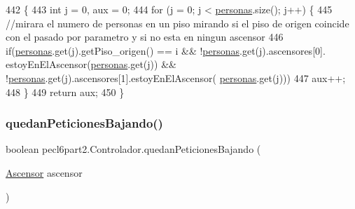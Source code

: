 \begin{DoxyCode}
442     \{
443         \textcolor{keywordtype}{int} j = 0, aux = 0;
444         \textcolor{keywordflow}{for} (j = 0; j < \mbox{\hyperlink{classpecl6part2_1_1_controlador_a570bc37c2db22f144af250ceccbbab6d}{personas}}.size(); j++) \{
445             \textcolor{comment}{//mirara el numero de personas en un piso mirando si el piso de origen coincide con el pasado
       por parametro y si no esta en ningun ascensor}
446             \textcolor{keywordflow}{if}(\mbox{\hyperlink{classpecl6part2_1_1_controlador_a570bc37c2db22f144af250ceccbbab6d}{personas}}.get(j).getPiso\_origen() == i && !\mbox{\hyperlink{classpecl6part2_1_1_controlador_a570bc37c2db22f144af250ceccbbab6d}{personas}}.get(j).ascensores[0].
      estoyEnElAscensor(\mbox{\hyperlink{classpecl6part2_1_1_controlador_a570bc37c2db22f144af250ceccbbab6d}{personas}}.get(j)) && !\mbox{\hyperlink{classpecl6part2_1_1_controlador_a570bc37c2db22f144af250ceccbbab6d}{personas}}.get(j).ascensores[1].estoyEnElAscensor(
      \mbox{\hyperlink{classpecl6part2_1_1_controlador_a570bc37c2db22f144af250ceccbbab6d}{personas}}.get(j)))
447                 aux++;
448         \}
449         \textcolor{keywordflow}{return} aux;
450     \}
\end{DoxyCode}
\mbox{\label{classpecl6part2_1_1_controlador_a18f3f9c74dda296867c72588a840880c}} 
\subsubsection{\texorpdfstring{quedan\+Peticiones\+Bajando()}{quedanPeticionesBajando()}}
{\footnotesize\ttfamily boolean pecl6part2.\+Controlador.\+quedan\+Peticiones\+Bajando (\begin{DoxyParamCaption}\item[{\mbox{\hyperlink{classpecl6part2_1_1_ascensor}{Ascensor}}}]{ascensor }\end{DoxyParamCaption})\hspace{0.3cm}{\ttfamily [inline]}}



